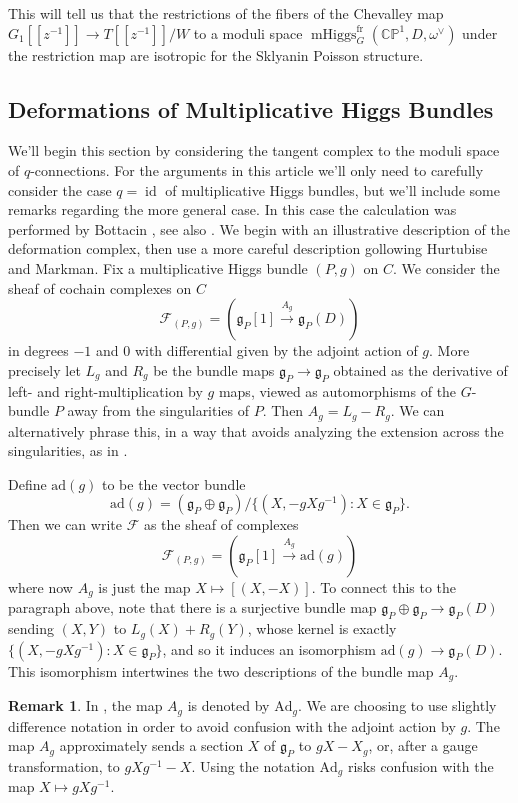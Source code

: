 \documentclass[11pt, oneside, reqno]{amsart}
\theoremstyle{definition} \newtheorem{definition}{Definition}[section]
\theoremstyle{definition} \newtheorem{remark}[definition]{Remark}
\theoremstyle{definition} \newtheorem{remarks}[definition]{Remarks}
\theoremstyle{definition} \newtheorem{question}[definition]{Question}
\theoremstyle{definition} \newtheorem*{note}{Note}
\theoremstyle{definition} \newtheorem{example}[definition]{Example}
\theoremstyle{definition} \newtheorem{examples}[definition]{Examples}
\renewcommand{\gg}{\mathfrak{g}}
\newcommand{\bb}[1]{\mathbb{#1}}
\newcommand{\mr}[1]{\mathrm{#1}}
\newcommand{\mc}[1]{\mathcal{#1}}
\DeclareMathOperator{\id}{id}
\DeclareMathOperator{\mhiggs}{mHiggs}
\newcommand{\fr}{\mathrm{fr}}
\newcommand{\ad}{\mr{ad}}
\newcommand{\Ad}{\mr{Ad}}
\begin{document}
This will tell us that the restrictions of the fibers of the Chevalley map $G_1[[z^{-1}]] \to T[[z^{-1}]]/W$ to a moduli space $\mhiggs^\fr_G(\bb{CP}^1, D, \omega^\vee)$ under the restriction map are isotropic for the Sklyanin Poisson structure.

\subsection{Deformations of Multiplicative Higgs Bundles}
We'll begin this section by considering the tangent complex to the moduli space of $q$-connections.  For the arguments in this article we'll only need to carefully consider the case $q=\id$ of multiplicative Higgs bundles, but we'll include some remarks regarding the more general case.  In this case the calculation was performed by Bottacin \cite{Bottacin}, see also \cite[Section 4]{HurtubiseMarkman}. We begin with an illustrative description of the deformation complex, then use a more careful description gollowing Hurtubise and Markman.  Fix a multiplicative Higgs bundle $(P,g)$ on $C$.  We consider the sheaf of cochain complexes on $C$
\[\mc F_{(P,g)} = (\gg_P[1] \overset {A_g} {\to} \gg_P(D))\]
in degrees $-1$ and 0 with differential given by the adjoint action of $g$.  More precisely let $L_g$ and $R_g$ be the bundle maps $\gg_P \to \gg_P$ obtained as the derivative of left- and right-multiplication by $g$ maps, viewed as automorphisms of the $G$-bundle $P$ away from the singularities of $P$.  Then $A_g = L_g - R_g$.  We can alternatively phrase this, in a way that avoids analyzing the extension across the singularities, as in \cite[Section 4]{HurtubiseMarkman}.  
 
Define $\ad(g)$ to be the vector bundle
\[\ad(g) = (\gg_P \oplus \gg_P)/\{(X, -g X g^{-1}): X \in \gg_P\}.\]
Then we can write $\mc F$ as the sheaf of complexes
\[\mc F_{(P,g)} = (\gg_P[1] \overset {A_g} {\to} \ad(g))\]
where now $A_g$ is just the map $X \mapsto [(X,-X)]$.  To connect this to the paragraph above, note that there is a surjective bundle map $\gg_P \oplus \gg_P \to \gg_P(D)$ sending $(X,Y)$ to $L_g(X) + R_g(Y)$, whose kernel is exactly $\{(X, -g X g^{-1}): X \in \gg_P\}$, and so it induces an isomorphism $\ad(g) \to \gg_P(D)$.  This isomorphism intertwines the two descriptions of the bundle map $A_g$.

\begin{remark}
In \cite{HurtubiseMarkman}, the map $A_g$ is denoted by $\Ad_g$.  We are choosing to use slightly difference notation in order to avoid confusion with the adjoint action by $g$.  The map $A_g$ approximately sends a section $X$ of $\gg_P$ to $gX - X_g$, or, after a gauge transformation, to $gXg^{-1} - X$.  Using the notation $\Ad_g$ risks confusion with the map $X \mapsto gXg^{-1}$.
\end{remark}
\end{document}
